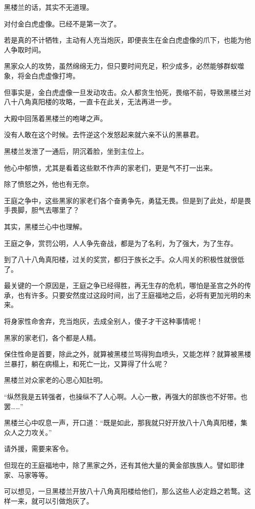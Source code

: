 \begin{this_body}
黑楼兰的话，其实不无道理。

对付金白虎虚像。已经不是第一次了。

若是真的不计牺牲，主动有人充当炮灰，即便丧生在金白虎虚像的爪下，也能为他人争取时间。

黑家众人的攻势，虽然绵绵无力，但只要时间充足，积少成多，必然能够群蚁噬象，将金白虎虚像打垮。

但事实是，金白虎虚像一旦发动攻击。众人都贪生怕死，畏缩不前，导致黑楼兰对八十八角真阳楼的攻略，一直卡在此关，无法再进一步。

大殿中回荡着黑楼兰的咆哮之声。

没有人敢在这个时候。去忤逆这个发怒起来就六亲不认的黑暴君。

黑楼兰发泄了一通后，阴沉着脸，坐到主位上。

他心中郁愤，尤其是看着这些默不作声的家老们，更是气不打一出来。

除了愤怒之外，他也有无奈。

王庭之争中，这些黑家的家老们各个奋勇争先，勇猛无畏。但是到了此处，却是畏手畏脚，胆气去哪里了？

其实，黑楼兰心中也理解。

王庭之争，赏罚公明，人人争先奋战，都是为了名利，为了强大，为了生存。

到了八十八角真阳楼，过关的奖赏，都归于族长之手。众人闯关的积极性就很低了。

最关键的一个原因是，王庭之争已经得胜，再无生存的危机，哪怕是圣宫之外的传承，也有许多。只要安然度过这段时间，出了王庭福地之后，必将有更加光明的未来。

将身家性命舍弃，充当炮灰，去成全别人，傻子才干这种事情呢！

黑家的家老们，各个都是人精。

保住性命是首要，除此之外，就算被黑楼兰骂得狗血喷头，又能怎样？就算被黑楼兰暴打，躺在病榻上，和死亡一比，又算得了什么呢？

黑楼兰对众家老的心思心知肚明。

“纵然我是五转强者，也操纵不了人心啊。人心一散，再强大的部族也不好带。也罢……”

黑楼兰心中叹息一声，开口道：“既是如此，那我就只好开放八十八角真阳楼，集众人之力攻关。”

请外援，需要来客令。

但现在的王庭福地中，除了黑家之外，还有其他大量的黄金部族族人。譬如耶律家、马家等等。

可以想见，一旦黑楼兰开放八十八角真阳楼给他们，那么这些人必定趋之若鹜。这样一来，就可以引做炮灰了。


\end{this_body}
